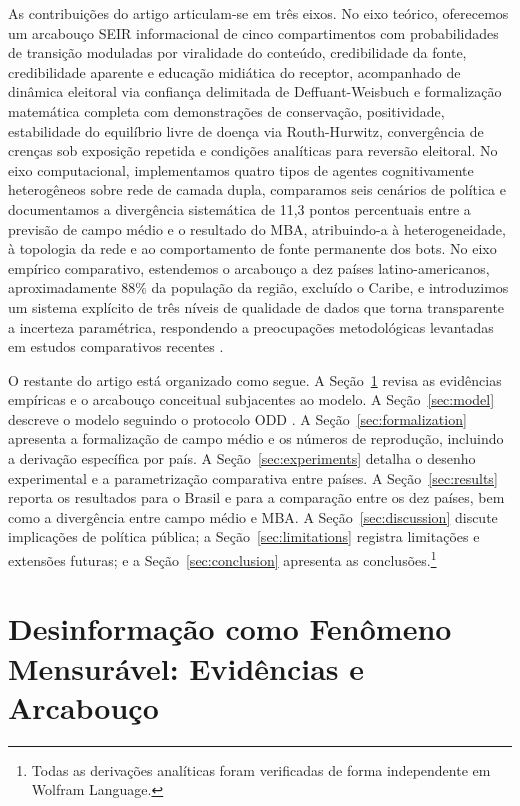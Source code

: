 \documentclass[12pt,a4paper]{article}
\theoremstyle{definition}
\theoremstyle{plain}
\begin{document}
As contribuições do artigo articulam-se em três eixos. No eixo teórico, oferecemos um arcabouço SEIR informacional de cinco compartimentos com probabilidades de transição moduladas por viralidade do conteúdo, credibilidade da fonte, credibilidade aparente e educação midiática do receptor, acompanhado de dinâmica eleitoral via confiança delimitada de Deffuant-Weisbuch e formalização matemática completa com demonstrações de conservação, positividade, estabilidade do equilíbrio livre de doença via Routh-Hurwitz, convergência de crenças sob exposição repetida e condições analíticas para reversão eleitoral. No eixo computacional, implementamos quatro tipos de agentes cognitivamente heterogêneos sobre rede de camada dupla, comparamos seis cenários de política e documentamos a divergência sistemática de 11,3 pontos percentuais entre a previsão de campo médio e o resultado do MBA, atribuindo-a à heterogeneidade, à topologia da rede e ao comportamento de fonte permanente dos bots. No eixo empírico comparativo, estendemos o arcabouço a dez países latino-americanos, aproximadamente 88\% da população da região, excluído o Caribe, e introduzimos um sistema explícito de três níveis de qualidade de dados que torna transparente a incerteza paramétrica, respondendo a preocupações metodológicas levantadas em estudos comparativos recentes \citep{lupu2020socialmedia, waisbord2018post, bradshaw2019global}.

O restante do artigo está organizado como segue. A Seção~\ref{sec:literature} revisa as evidências empíricas e o arcabouço conceitual subjacentes ao modelo. A Seção~\ref{sec:model} descreve o modelo seguindo o protocolo ODD \citep{grimm2010odd}. A Seção~\ref{sec:formalization} apresenta a formalização de campo médio e os números de reprodução, incluindo a derivação específica por país. A Seção~\ref{sec:experiments} detalha o desenho experimental e a parametrização comparativa entre países. A Seção~\ref{sec:results} reporta os resultados para o Brasil e para a comparação entre os dez países, bem como a divergência entre campo médio e MBA. A Seção~\ref{sec:discussion} discute implicações de política pública; a Seção~\ref{sec:limitations} registra limitações e extensões futuras; e a Seção~\ref{sec:conclusion} apresenta as conclusões.\footnote{Todas as derivações analíticas foram verificadas de forma independente em Wolfram Language.}

\section{Desinformação como Fenômeno Mensurável: Evidências e Arcabouço}
\label{sec:literature}
\end{document}
